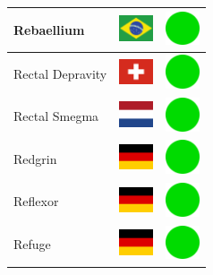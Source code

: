 \documentclass[12pt, a4paper, twoside]{report}
\begin{document}
\begin{center}
\begin{longtable}{|p{5cm}|p{2cm}|p{2cm}|}
 Rebaellium                                                 & \includegraphics[width=1cm]{../4x3/br} &   \includegraphics[width=1cm]{../likes/y} \\ \hline
 Rectal Depravity                                           & \includegraphics[width=1cm]{../4x3/ch} &   \includegraphics[width=1cm]{../likes/y} \\ \hline
 Rectal Smegma                                              & \includegraphics[width=1cm]{../4x3/nl} &   \includegraphics[width=1cm]{../likes/y} \\ \hline
 Redgrin                                                    & \includegraphics[width=1cm]{../4x3/de} &   \includegraphics[width=1cm]{../likes/y} \\ \hline
 Reflexor                                                   & \includegraphics[width=1cm]{../4x3/de} &   \includegraphics[width=1cm]{../likes/y} \\ \hline
 Refuge                                                     & \includegraphics[width=1cm]{../4x3/de} &   \includegraphics[width=1cm]{../likes/y} \\ \hline

\end{longtable}
\end{center}
\end{document}
